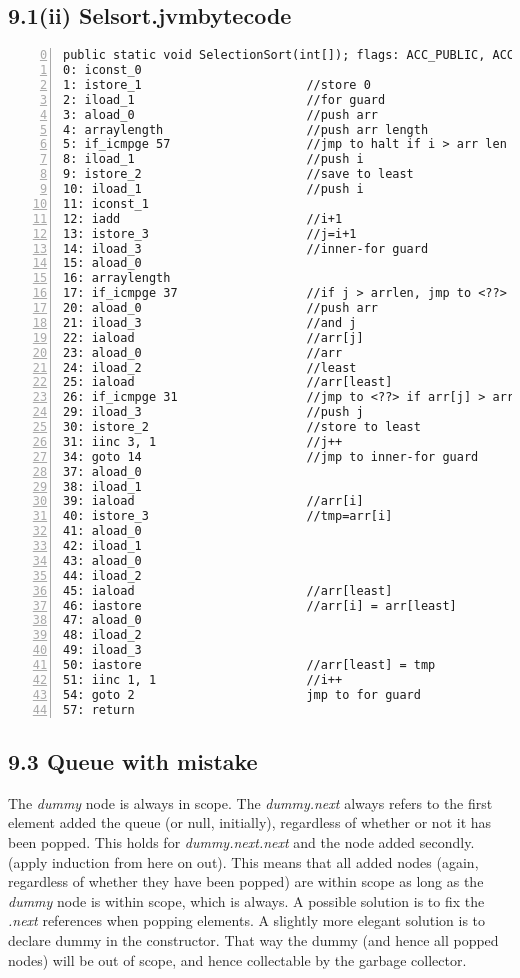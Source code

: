 \documentclass[a4paper, titlepage]{article}
\begin{document}
\subsection*{9.1(ii) Selsort.jvmbytecode}
\begin{lstlisting}[numbers=left, firstnumber=0, title=Selsort.jvmbytecode]
  public static void SelectionSort(int[]); flags: ACC_PUBLIC, ACC_STATIC Code: stack=4, locals=4, args_size=1
0: iconst_0
1: istore_1                       //store 0
2: iload_1                        //for guard
3: aload_0                        //push arr
4: arraylength                    //push arr length
5: if_icmpge 57                   //jmp to halt if i > arr len
8: iload_1                        //push i
9: istore_2                       //save to least
10: iload_1                       //push i
11: iconst_1
12: iadd                          //i+1
13: istore_3                      //j=i+1
14: iload_3                       //inner-for guard
15: aload_0
16: arraylength
17: if_icmpge 37                  //if j > arrlen, jmp to <??>
20: aload_0                       //push arr
21: iload_3                       //and j
22: iaload                        //arr[j]
23: aload_0                       //arr
24: iload_2                       //least
25: iaload                        //arr[least]
26: if_icmpge 31                  //jmp to <??> if arr[j] > arr[least]
29: iload_3                       //push j       
30: istore_2                      //store to least
31: iinc 3, 1                     //j++
34: goto 14                       //jmp to inner-for guard
37: aload_0
38: iload_1
39: iaload                        //arr[i]
40: istore_3                      //tmp=arr[i]
41: aload_0
42: iload_1
43: aload_0
44: iload_2
45: iaload                        //arr[least]
46: iastore                       //arr[i] = arr[least]
47: aload_0
48: iload_2
49: iload_3
50: iastore                       //arr[least] = tmp
51: iinc 1, 1                     //i++
54: goto 2                        jmp to for guard
57: return
\end{lstlisting}

\subsection*{9.3 Queue with mistake}
The \emph{dummy} node is always in scope. The \emph{dummy.next} always refers to the
first element added the queue (or null, initially), regardless of whether or not
it has been popped. This holds for \emph{dummy.next.next} and the node added
secondly. (apply induction from here on out). This means that all added nodes
(again, regardless of whether they have been popped) are within scope as long as
the \emph{dummy} node is within scope, which is always.
A possible solution is to fix the \emph{.next} references when popping elements.
A slightly more elegant solution is to declare dummy in the constructor. That
way the dummy (and hence all popped nodes) will be out of scope, and hence
collectable by the garbage collector.
\end{document}
